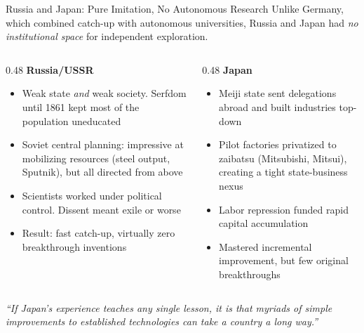 \documentclass[aspectratio=169, 11pt]{beamer}
\begin{document}
\begin{frame}{Russia and Japan: Pure Imitation, No Autonomous Research}
    \small
    Unlike Germany, which combined catch-up with autonomous universities, Russia and Japan had \textit{no institutional space} for independent exploration.

    \vspace{0.3em}
    \begin{columns}[T]
        \begin{column}{0.48\textwidth}
            \textbf{Russia/USSR}
            \begin{itemize}
                \item Weak state \textit{and} weak society. Serfdom until 1861 kept most of the population uneducated
                \item Soviet central planning: impressive at mobilizing resources (steel output, Sputnik), but all directed from above
                \item Scientists worked under political control. Dissent meant exile or worse
                \item Result: fast catch-up, virtually zero breakthrough inventions
            \end{itemize}
        \end{column}
        \begin{column}{0.48\textwidth}
            \textbf{Japan}
            \begin{itemize}
                \item Meiji state sent delegations abroad and built industries top-down
                \item Pilot factories privatized to zaibatsu (Mitsubishi, Mitsui), creating a tight state-business nexus
                \item Labor repression funded rapid capital accumulation
                \item Mastered incremental improvement, but few original breakthroughs
            \end{itemize}
        \end{column}
    \end{columns}

    \vspace{0.3em}
    \begin{center}
        \textit{``If Japan's experience teaches any single lesson, it is that myriads of simple improvements to established technologies can take a country a long way.''}
    \end{center}
\end{frame}
\end{document}
